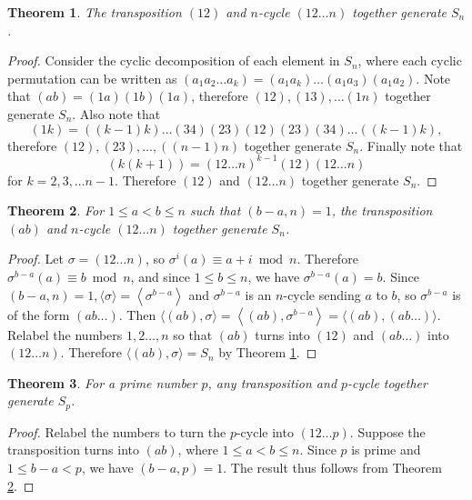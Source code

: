 \documentclass[12pt]{article}
\newtheorem{theorem}{Theorem}
\begin{document}
\begin{theorem} \label{thm:symmetric-12-12n}
    The transposition $(12)$ and $n$-cycle $(12 \dots n)$ together generate
    $S_n$.
\end{theorem}
\begin{proof}
    Consider the cyclic decomposition of each element in $S_n$, where each
    cyclic permutation can be written as
    $
        (a_1a_2\dots a_k) = (a_1 a_k) \dots (a_1 a_3) (a_1 a_2).
    $
    Note that $(ab) = (1a)(1b)(1a)$, therefore $(12), (13), \ldots (1n)$
    together generate $S_n$. Also note that
    $$(1k)=((k-1)k)\dots(34)(23)(12)(23)(34)\dots((k-1)k),$$
    therefore $(12), (23), \dots, ((n-1)n)$ together generate $S_n$. Finally
    note that
    $$
        (k(k+1)) = (12\dots n)^{k-1} (12) (12\dots n)
    $$
    for $k = 2, 3, \dots n - 1$. Therefore $(12)$ and $(12 \dots n)$ together
    generate $S_n$.
\end{proof}

\begin{theorem} \label{thm:symmetric-ab-12n}
    For $1 \le a < b \le n$ such that $(b - a, n) = 1$, the transposition
    $(ab)$ and $n$-cycle $(12 \dots n)$ together generate $S_n$.
\end{theorem}
\begin{proof}
    Let $\sigma=(12 \ldots n)$, so $\sigma^i(a) \equiv a+i \bmod n$. Therefore
    $\sigma^{b-a}(a) \equiv b \bmod n$, and since $1 \le b \le n$, we have
    $\sigma^{b-a}(a)=b$. Since $(b-a,
        n)=1,\langle\sigma\rangle=\left\langle\sigma^{b-a}\right\rangle$ and
    $\sigma^{b-a}$ is an $n$-cycle sending $a$ to $b$, so $\sigma^{b-a}$ is of
    the
    form $(a b \ldots)$. Then
    $
        \langle(a b), \sigma\rangle=\left\langle(a b),
        \sigma^{b-a}\right\rangle=\langle(a b),(a b \ldots)\rangle .
    $
    Relabel the numbers $1,2 \ldots, n$ so that $(a b)$ turns into $(12)$ and
    $(a b
        \ldots)$ into $(12 \ldots n)$. Therefore $\langle(a b),
        \sigma\rangle=S_n$ by
    Theorem \ref{thm:symmetric-12-12n}.
\end{proof}

\begin{theorem} \label{thm:symmetric-prime}
    For a prime number $p$, any transposition and $p$-cycle together generate
    $S_p$.
\end{theorem}
\begin{proof}
    Relabel the numbers to turn the $p$-cycle into $(12 \dots p)$.
    Suppose the transposition turns into $(ab)$, where $1 \le a < b \le n$.
    Since
    $p$ is prime and $1 \le b - a < p$, we have $(b - a, p) = 1$. The result
    thus
    follows from Theorem \ref{thm:symmetric-ab-12n}.
\end{proof}
\end{document}
